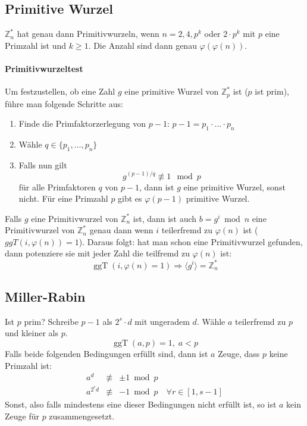 \documentclass[8pt,a4paper,landscape]{article}
\begin{document}
\begin{multicols}{4}
\subsection{Primitive Wurzel}
\(\mathbb{Z}_{n}^{*}\) hat genau dann Primitivwurzeln,  wenn 
\(n = 2,4, p^{k}\) oder \(2 \cdot p^{k}\) mit \(p\) eine Primzahl ist und \(k \geq 1\). Die Anzahl sind dann genau \(\varphi(\varphi(n))\).

\paragraph{Primitivwurzeltest} Um festzustellen, ob eine Zahl $g$ eine primitive Wurzel von 
$\mathbb{Z}_{p}^{*}$ ist ($p$ ist prim), führe man folgende Schritte aus:
\begin{enumerate}
\item Finde die Primfaktorzerlegung von $p-1$: \( p-1=p_{1} \cdot \ldots \cdot  p_{n}\)
\item Wähle \(q \in \{p_{1}, \ldots,p_{n}\}\)
\item Falls nun gilt
\[
    \boxed{ g^{(p-1)/q} \not\equiv 1 \mod p }
\]
für alle Primfaktoren $q$ von $p-1$, dann ist $g$ eine primitive Wurzel,
sonst nicht. Für eine Primzahl $p$ gibt es $\varphi(p-1)$ primitive Wurzel.
\end{enumerate}
Falls $g$ eine Primitivwurzel von $\mathbb{Z}_{n}^{*}$ ist, dann ist auch 
$b = g^{i} \bmod n$ eine Primitivwurzel von $\mathbb{Z}_{n}^{*}$ genau dann 
wenn $i$ teilerfremd zu $\varphi(n)$ ist ($ggT(i, \varphi(n)) = 1$). Daraus folgt:
hat man schon eine Primitivwurzel gefunden, dann potenziere sie mit jeder Zahl die teilfremd zu $\varphi(n)$ ist:
\[
    \operatorname{ggT}(i, \varphi(n) = 1) \Rightarrow
    \langle g^{i} \rangle = \mathbb{Z}_{n}^{*}
\]

\subsection{Miller-Rabin}
Ist $p$ prim? Schreibe $p-1$ als $2^{s}\cdot d$ mit ungeradem $d$.
Wähle $a$ teilerfremd zu $p$ und kleiner als $p$. 
\[\operatorname{ggT}(a, p) = 1, \; a<p\]
Falls beide folgenden Bedingungen erfüllt sind, dann ist $a$ Zeuge,
dass $p$ keine Primzahl ist:
\begin{eqnarray}
a^{d} &\not\equiv& \pm 1 \bmod p \nonumber\\
a^{2^{r}d} &\not\equiv& -1 \bmod p \quad \forall r \in [1,s-1]\nonumber
\end{eqnarray}
Sonst, also falls mindestens eine dieser Bedingungen nicht erfüllt ist, so ist $a$ kein Zeuge für $p$ zusammengesetzt. 


\end{multicols}
\end{document}
